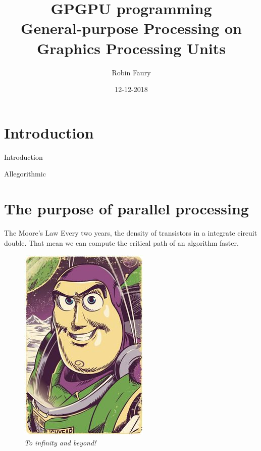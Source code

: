\documentclass{beamer}
\title{GPGPU programming\\General-purpose Processing on Graphics Processing Units}
\author{Robin Faury}
\date{12-12-2018}
\begin{document}
\begin{frame}
\titlepage
\end{frame}

\section{Introduction}
\begin{frame}{Introduction}
	
\end{frame}

\begin{frame}{Allegorithmic}
	
\end{frame}

\section{The purpose of parallel processing}
\begin{frame}{The Moore's Law}
	Every two years, the density of transistors in a integrate circuit double. That mean we can compute the critical path of an algorithm faster.
	\begin{figure}
		\includegraphics[scale=0.2]{figures/buzz1.jpg}
		\caption{\textit{To infinity and beyond!}}
	\end{figure}
\end{frame}
\end{document}
